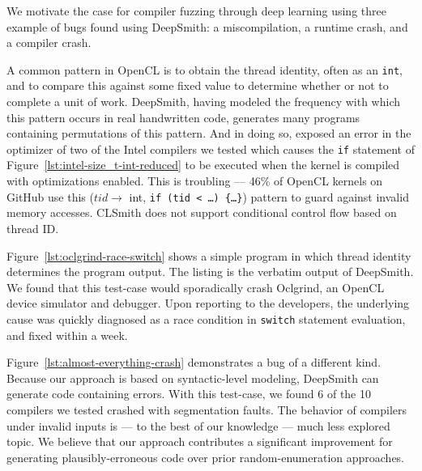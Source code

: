 We motivate the case for compiler fuzzing through deep learning using three example of bugs found using DeepSmith: a miscompilation, a runtime crash, and a compiler crash.

A common pattern in OpenCL is to obtain the thread identity, often as an \texttt{int}, and to compare this against some fixed value to determine whether or not to complete a unit of work. DeepSmith, having modeled the frequency with which this pattern occurs in real handwritten code, generates many programs containing permutations of this pattern. And in doing so, exposed an error in the optimizer of two of the Intel compilers we tested
which causes the \texttt{if} statement of Figure~\ref{lst:intel-size_t-int-reduced} to be executed when the kernel is compiled with optimizations enabled.
%
This is troubling --- 46\% of OpenCL kernels on GitHub use this ($tid \rightarrow$ int, \texttt{if (tid < \ldots) \{\ldots\}}) pattern to guard against invalid memory accesses. CLSmith does not support conditional control flow based on thread ID. %

Figure~\ref{lst:oclgrind-race-switch} shows a simple program in which thread identity determines the program output. The listing is the verbatim output of DeepSmith. We found that this test-case would sporadically crash Oclgrind, an OpenCL device simulator and debugger. Upon reporting to the developers, the underlying cause was quickly diagnosed as a race condition in \texttt{switch} statement evaluation, and fixed within a week.

Figure~\ref{lst:almost-everything-crash} demonstrates a bug of a different kind. Because our approach is based on syntactic-level modeling, DeepSmith can generate code containing errors. With this test-case, we found 6 of the 10 compilers we tested crashed with segmentation faults. The behavior of compilers under invalid inputs is --- to the best of our knowledge --- much less explored topic. We believe that our approach contributes a significant improvement for generating plausibly-erroneous code over prior random-enumeration approaches.
